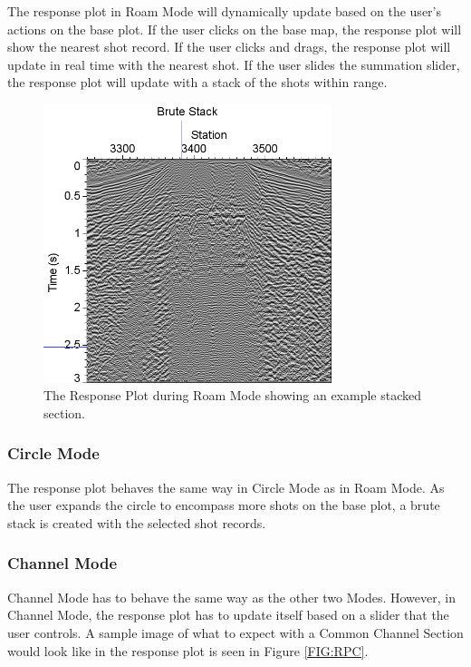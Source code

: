\documentclass[12pt]{article}
\begin{document}
The response plot in Roam Mode will dynamically update based on the user's actions on the base plot. If the user clicks on the base map, the response plot will show the nearest shot record. If the user clicks and drags, the response plot will update in real time with the nearest shot. If the user slides the summation slider, the response plot will update with a stack of the shots within range.

\begin{figure}[H]
\centering
\includegraphics[width=0.75\textwidth]{./figs/fig3.png}
\caption{The Response Plot during Roam Mode showing an example stacked section.}
\label{FIG:RPR}
\end{figure}

\subsubsection{Circle Mode}

The response plot behaves the same way in Circle Mode as in Roam Mode. As the user expands the circle to encompass more shots on the base plot, a brute stack is created with the selected shot records. 

\subsubsection{Channel Mode}

Channel Mode has to behave the same way as the other two Modes. However, in Channel Mode, the response plot has to update itself based on a slider that the user controls. A sample image of what to expect with a Common Channel Section would look like in the response plot is seen in Figure \ref{FIG:RPC}.
\end{document}
